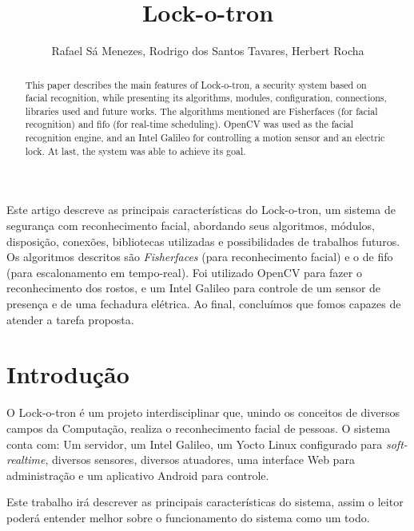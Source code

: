 \documentclass[12pt]{article}
\title{Lock-o-tron}
\author{Rafael Sá Menezes\inst{1}, Rodrigo dos Santos Tavares\inst{1}, Herbert Rocha\inst{1} }
\begin{document}
\maketitle

\begin{abstract}
    This paper describes the main features of Lock-o-tron, a security system
    based on facial recognition, while presenting its algorithms, modules,
    configuration, connections, libraries used and future works. The algorithms
    mentioned are Fisherfaces (for facial recognition) and fifo (for real-time
    scheduling). OpenCV was used as the facial recognition engine, and an Intel
    Galileo for controlling a motion sensor and an electric lock. At last, the
    system was able to achieve its goal.

\end{abstract}

\begin{resumo}
    Este artigo descreve as principais características do Lock-o-tron, um
    sistema de segurança com reconhecimento facial, abordando seus algoritmos,
    módulos, disposição, conexões, bibliotecas utilizadas e possibilidades de
    trabalhos futuros. Os algoritmos descritos são \textit{Fisherfaces} (para
    reconhecimento facial) e o de fifo (para escalonamento em tempo-real).
    Foi utilizado OpenCV para fazer o reconhecimento dos rostos, e um Intel
    Galileo para controle de um sensor de presença e de uma fechadura elétrica.
    Ao final, concluímos que fomos capazes de atender a tarefa proposta.
\end{resumo}


\section{Introdução}
    O Lock-o-tron é um projeto interdisciplinar que, unindo os conceitos de
    diversos campos da Computação, realiza o reconhecimento facial de pessoas. O
    sistema conta com: Um servidor, um Intel Galileo, um Yocto Linux configurado
    para \textit{soft-realtime}, diversos sensores, diversos atuadores, uma
    interface Web para administração e um aplicativo Android para controle.

    Este trabalho irá descrever as principais características do sistema, assim
    o leitor poderá entender melhor sobre o funcionamento do sistema como um
    todo.

\end{document}
